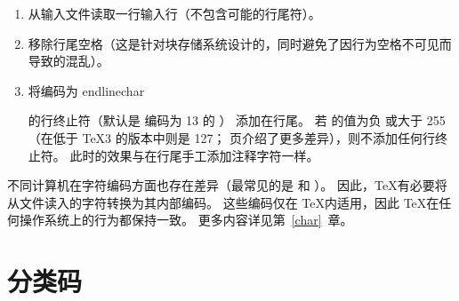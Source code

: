 \documentclass{book}
\begin{document}
\begin{enumerate}
\item 从输入文件读取一行输入行（不包含可能的行尾符）。
\item 移除行尾空格（这是针对块存储系统设计的，同时避免了因行为空格不可见而导致的混乱）。
\item 将编码为 \csterm endlinechar\par 的行终止符（默认是 \ascii 编码为 13 的 ）
      添加在行尾。
      若  的值为负\label{append:elc}%
      或大于 255（在低于 \TeX 3 的版本中则是 127；\pageref{2vs3} 页介绍了更多差异），则不添加任何行终止符。
      此时的效果与在行尾手工添加注释字符一样。
\end{enumerate}


不同计算机在字符编码方面也存在差异（最常见的是 \ascii 和 \ebcdic{}）。
因此，\TeX 有必要将从文件读入的字符转换为其内部编码。
这些编码仅在 \TeX 内适用，因此 \TeX 在任何操作系统上的行为都保持一致。
更多内容详见第~\ref{char}~章。

\section{分类码}
\end{document}
